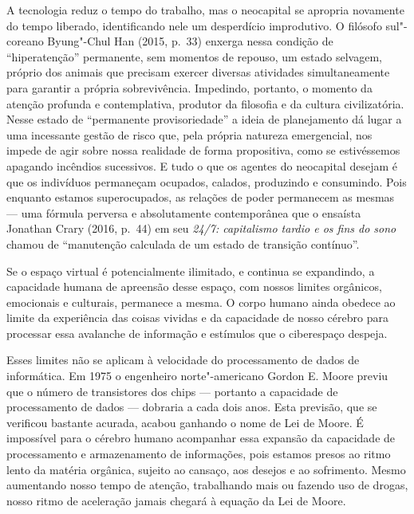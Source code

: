 A tecnologia reduz o tempo do trabalho, mas o neocapital se apropria
novamente do tempo liberado, identificando nele um desperdício
improdutivo. O filósofo sul"-coreano Byung"-Chul Han (2015, p.~33) enxerga
nessa condição de ``hiperatenção'' permanente, sem momentos de repouso,
um estado selvagem, próprio dos animais que precisam exercer diversas
atividades simultaneamente para garantir a própria sobrevivência.
Impedindo, portanto, o momento da atenção profunda e contemplativa,
produtor da filosofia e da cultura civilizatória. Nesse estado de
``permanente provisoriedade'' a ideia de planejamento dá lugar a uma
incessante gestão de risco que, pela própria natureza emergencial, nos
impede de agir sobre nossa realidade de forma propositiva, como se
estivéssemos apagando incêndios sucessivos. E tudo o que os agentes do
neocapital desejam é que os indivíduos permaneçam ocupados, calados,
produzindo e consumindo. Pois enquanto estamos superocupados, as
relações de poder permanecem as mesmas --- uma fórmula perversa e
absolutamente contemporânea que o ensaísta Jonathan Crary (2016, p.~44)
em seu \emph{24/7: capitalismo tardio e os fins do sono} chamou de
``manutenção calculada de um estado de transição contínuo''.

Se o espaço virtual é potencialmente ilimitado, e continua se
expandindo, a capacidade humana de apreensão desse espaço, com nossos
limites orgânicos, emocionais e culturais, permanece a mesma. O corpo
humano ainda obedece ao limite da experiência das coisas vividas e da
capacidade de nosso cérebro para processar essa avalanche de informação
e estímulos que o ciberespaço despeja.

Esses limites não se aplicam à velocidade do processamento de dados de
informática. Em 1975 o engenheiro norte"-americano Gordon E. Moore previu
que o número de transistores dos chips --- portanto a capacidade de
processamento de dados --- dobraria a cada dois anos. Esta previsão, que
se verificou bastante acurada, acabou ganhando o nome de Lei de Moore. É
impossível para o cérebro humano acompanhar essa expansão da capacidade de
processamento e armazenamento de informações, pois estamos presos ao
ritmo lento da matéria orgânica, sujeito ao cansaço, aos desejos e ao %
sofrimento. Mesmo aumentando nosso tempo de atenção, trabalhando mais ou
fazendo uso de drogas, nosso ritmo de aceleração jamais chegará à
equação da Lei de Moore.

